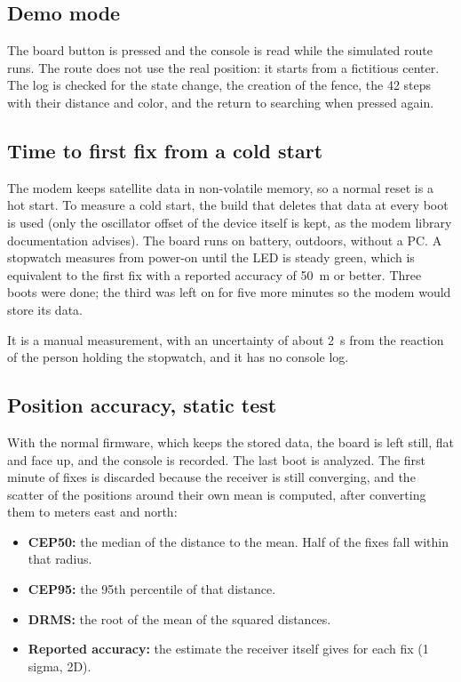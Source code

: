 \subsection{Demo mode}

The board button is pressed and the console is read while the simulated route runs. The route does not use the
real position: it starts from a fictitious center. The log is checked for the state change, the creation of the
fence, the 42 steps with their distance and color, and the return to searching when pressed again.

\subsection{Time to first fix from a cold start}

The modem keeps satellite data in non-volatile memory, so a normal reset is a hot start. To measure a cold
start, the build that deletes that data at every boot is used (only the oscillator offset of the device itself
is kept, as the modem library documentation advises). The board runs on battery, outdoors, without a PC. A
stopwatch measures from power-on until the LED is steady green, which is equivalent to the first fix with a
reported accuracy of 50~m or better. Three boots were done; the third was left on for five more minutes so the
modem would store its data.

It is a manual measurement, with an uncertainty of about 2~s from the reaction of the person holding the
stopwatch, and it has no console log.

\subsection{Position accuracy, static test}

With the normal firmware, which keeps the stored data, the board is left still, flat and face up, and the
console is recorded. The last boot is analyzed. The first minute of fixes is discarded because the receiver is
still converging, and the scatter of the positions around their own mean is computed, after converting them to
meters east and north:

\begin{itemize}
  \item \textbf{CEP50:} the median of the distance to the mean. Half of the fixes fall within that radius.
  \item \textbf{CEP95:} the 95th percentile of that distance.
  \item \textbf{DRMS:} the root of the mean of the squared distances.
  \item \textbf{Reported accuracy:} the estimate the receiver itself gives for each fix (1 sigma, 2D).
\end{itemize}

